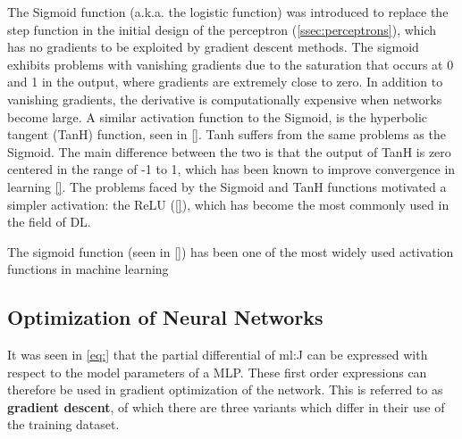The Sigmoid function (a.k.a. the logistic function) was introduced to replace
the step function in the initial design of the perceptron
(\autoref{ssec:perceptrons}), which has no gradients to be exploited by gradient
descent methods. The sigmoid exhibits problems with vanishing gradients due to
the saturation that occurs at 0 and 1 in the output, where gradients are
extremely close to zero. In addition to vanishing gradients, the derivative is
computationally expensive when networks become large. A similar activation
function to the Sigmoid, is the hyperbolic tangent (TanH) function, seen in
\autoref{}. Tanh suffers from the same problems as the Sigmoid. The main
difference between the two is that the output of TanH is zero centered in the
range of -1 to 1, which has been known to improve convergence in learning
\autoref{}. The problems faced by the Sigmoid and TanH functions motivated a
simpler activation: the ReLU (\autoref{}), which has become the most commonly
used in the field of \gls{DL}.

The sigmoid function (seen in \autoref{}) has been one of the most widely
used activation functions in machine learning

%    

%
\newpage

\subsection{Optimization of Neural Networks}


It was seen in \autoref{eq:} that the partial differential of \gls{ml:J} can be
expressed with respect to the model parameters of a \gls{MLP}. These first
order expressions can therefore be used in gradient optimization of the network.
This is referred to as \textbf{gradient descent}, of which there are three
variants which differ in their use of the training dataset.

